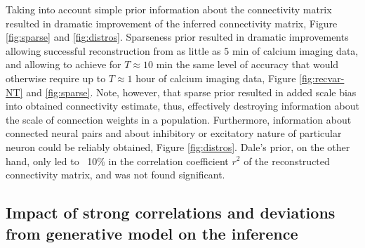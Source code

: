 Taking into account simple prior information about the connectivity matrix resulted in dramatic improvement of the inferred connectivity matrix, Figure \ref{fig:sparse} and \ref{fig:distros}. Sparseness prior resulted in dramatic improvements allowing successful reconstruction from as little as 5 min of calcium imaging data, and allowing to achieve for $T\approx 10$ min the same level of accuracy that would otherwise require up to $T\approx 1$ hour of calcium imaging data, Figure \ref{fig:recvar-NT} and \ref{fig:sparse}.
Note, however, that sparse prior resulted in added scale bias into obtained connectivity estimate, thus, effectively destroying information about the scale of connection weights in a population.
Furthermore, information about connected neural pairs and about inhibitory or excitatory nature of particular neuron could be reliably obtained, Figure \ref{fig:distros}.
Dale's prior, on the other hand, only led to ~10\% in the correlation coefficient $r^2$ of the reconstructed connectivity matrix, and was not found significant.

\subsection{Impact of strong correlations and deviations from generative model on the inference}

